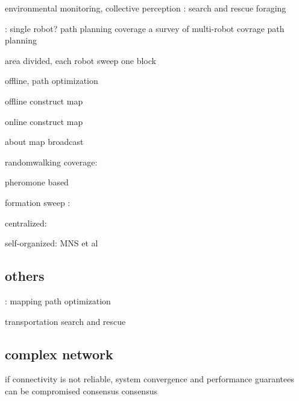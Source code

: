 environmental monitoring, collective perception
\cite{schmickl2006collective} : 
\cite{baxter2007multi} search and rescue
\cite{lima2017cellular} foraging

\cite{julia2012comparison} : single robot? path planning coverage
\cite{almadhoun2019survey} a survey of multi-robot covrage path planning
\cite{avellar2015multi}

area divided, each robot sweep one block
\cite{rekleitis2008efficient}
\cite{scherer2015autonomous}

offline, path optimization
\cite{nazarahari2019multi}
\cite{thabit2018multi}
\cite{yu2016optimal}

offline construct map
\cite{mirzaei2011cooperative}

online construct map
\cite{ge2005complete}
\cite{miki2018multi}

about map broadcast
\cite{marjovi2009multi}
\cite{albani2017field}

randomwalking coverage:
\cite{kegeleirs2019random}
\cite{huang2019exploration}
\cite{ichikawa1999characteristics}
\cite{mcguire2019minimal}
\cite{pang2021effect}
\cite{khaluf2018collective}
\cite{zia2017cognitive}

pheromone based
\cite{koenig2001terrain}
\cite{schroeder2017efficient}
\cite{deshpande2017robot}
\cite{maftuleac2015local}
\cite{stirling2010energy}

formation sweep :

centralized:
\cite{campbell2012review}
\cite{wang1991navigation}
\cite{din2018behavior}

self-organized: 
MNS et al
\cite{jamshidpey2020multi}
\cite{jamshidpey2023reducing}
\cite{mathews2017mergeable}
\cite{zhang2023self}
\cite{zhu2020formation}
\cite{zhu2024self}

\subsection{others}:
\cite{howard2006multi} mapping
\cite{psaraftis2016dynamic} path optimization

\cite{tuci2018cooperative} transportation
\cite{robin2016multi} search and rescue



\subsection{complex network}
\cite{kirst2016dynamic}
\cite{zavlanos2011graph}

if connectivity is not reliable, system convergence and performance guarantees can be compromised
\cite{cortes2008distributed} consensus
\cite{de2006decentralized}
\cite{moreau2005stability}
\cite{olfati2007consensus} consensus


